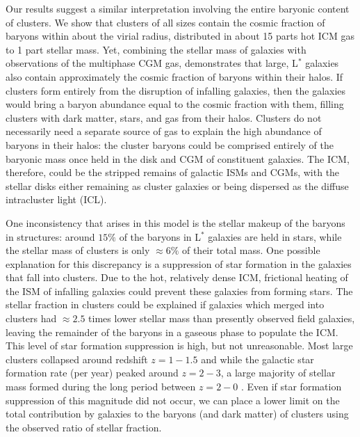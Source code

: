 Our results suggest a similar interpretation involving the entire
baryonic content of clusters. We show that clusters of all sizes
contain the cosmic fraction of baryons within about the virial radius,
distributed in about 15 parts hot ICM gas to 1 part stellar mass. Yet,
combining the stellar mass of galaxies with observations of the
multiphase CGM gas, \citet{Werk2014} demonstrates that large, L$^*$
galaxies also contain approximately the cosmic fraction of baryons
within their halos. If clusters form entirely from the disruption of
infalling galaxies, then the galaxies would bring a baryon abundance
equal to the cosmic fraction with them, filling clusters with dark
matter, stars, and gas from their halos. Clusters do not necessarily
need a separate source of gas to explain the high abundance of baryons
in their halos: the cluster baryons could be comprised entirely of the
baryonic mass once held in the disk and CGM of constituent
galaxies. The ICM, therefore, could be the stripped remains of
galactic ISMs and CGMs, with the stellar disks either remaining as
cluster galaxies or being dispersed as the diffuse intracluster light
(ICL).

One inconsistency that arises in this model is the stellar makeup of
the baryons in structures: around $15\%$ of the baryons in L$^*$
galaxies are held in stars, while the stellar mass of clusters is only
$\approx6\%$ of their total mass. One possible explanation for this
discrepancy is a suppression of star formation in the galaxies that
fall into clusters. Due to the hot, relatively dense ICM, frictional
heating of the ISM of infalling galaxies could prevent these galaxies
from forming stars. The stellar fraction in clusters could be
explained if galaxies which merged into clusters had $\approx 2.5$
times lower stellar mass than presently observed field galaxies,
leaving the remainder of the baryons in a gaseous phase to populate
the ICM. This level of star formation suppression is high, but not
unreasonable. Most large clusters collapsed around redshift $z=1-1.5$
\citep{Eke1996, Battaglia2013} and while the galactic star formation
rate (per year) peaked around $z=2-3$, a large majority of stellar
mass formed during the long period between $z=2-0$
\citep{Hopkins2006}. Even if star formation suppression of this
magnitude did not occur, we can place a lower limit on the total
contribution by galaxies to the baryons (and dark matter) of clusters
using the observed ratio of stellar fraction.

